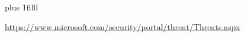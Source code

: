 \documentclass[accentcolor=tud9c,colorbacktitle,xcolor=dvipsnames]{tudbeamer}
\begin{document}
\begin{frame}[plain]
    \vskip0pt plus 1filll
    \begin{footnotesize}
        \url{https://www.microsoft.com/security/portal/threat/Threats.aspx}
    \end{footnotesize}
\end{frame}
\end{document}
